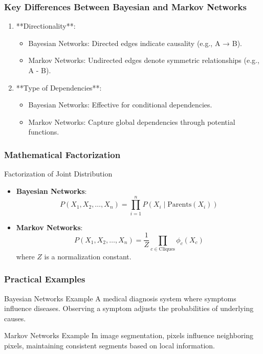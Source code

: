 \documentclass[aspectratio=169]{beamer}
\begin{document}
\begin{frame}[fragile]
    \frametitle{Key Differences Between Bayesian and Markov Networks}
    \begin{enumerate}
        \item **Directionality**:
            \begin{itemize}
                \item Bayesian Networks: Directed edges indicate causality (e.g., A → B).
                \item Markov Networks: Undirected edges denote symmetric relationships (e.g., A - B).
            \end{itemize}
        \item **Type of Dependencies**:
            \begin{itemize}
                \item Bayesian Networks: Effective for conditional dependencies.
                \item Markov Networks: Capture global dependencies through potential functions.
            \end{itemize}
    \end{enumerate}
\end{frame}

\begin{frame}[fragile]
    \frametitle{Mathematical Factorization}
    \begin{block}{Factorization of Joint Distribution}
        \begin{itemize}
            \item \textbf{Bayesian Networks}:
                \[
                P(X_1, X_2, \ldots, X_n) = \prod_{i=1}^{n} P(X_i \mid \text{Parents}(X_i))
                \]
            \item \textbf{Markov Networks}:
                \[
                P(X_1, X_2, \ldots, X_n) = \frac{1}{Z} \prod_{c \in \text{Cliques}} \phi_c(X_c)
                \]
                where \(Z\) is a normalization constant.
        \end{itemize}
    \end{block}
\end{frame}

\begin{frame}[fragile]
    \frametitle{Practical Examples}
    \begin{block}{Bayesian Networks Example}
        A medical diagnosis system where symptoms influence diseases. Observing a symptom adjusts the probabilities of underlying causes.
    \end{block}

    \begin{block}{Markov Networks Example}
        In image segmentation, pixels influence neighboring pixels, maintaining consistent segments based on local information.
    \end{block}
\end{frame}
\end{document}
